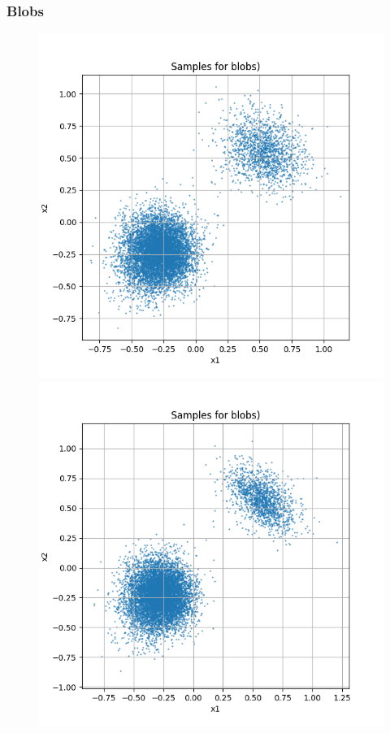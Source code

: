 \documentclass[a4paper,12pt]{article}
\begin{document}
\subsubsection*{Blobs}
\begin{figure}[H]
  \centering
  \begin{minipage}{0.3\textwidth}
      \centering
      \includegraphics[width=\linewidth]{images/Samples for ddpm_2_200_0.0001_0.02_blobs_linear.png}
  \end{minipage}
  \begin{minipage}{0.3\textwidth}
      \centering
      \includegraphics[width=\linewidth]{images/Samples for ddpm_2_200_0.0001_0.02_blobs_cosine.png}

\end{minipage}
\end{figure}
\end{document}
